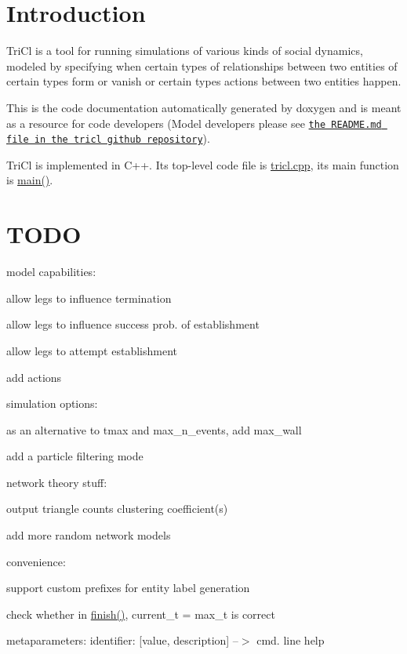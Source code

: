 \section*{Introduction }

Tri\+Cl is a tool for running simulations of various kinds of social dynamics, modeled by specifying when certain types of relationships between two entities of certain types form or vanish or certain types actions between two entities happen.

This is the code documentation automatically generated by doxygen and is meant as a resource for code developers (Model developers please see \href{https://github.com/mensch72/tricl}{\tt the R\+E\+A\+D\+M\+E.\+md file in the tricl github repository}).

Tri\+Cl is implemented in C++. Its top-\/level code file is \hyperlink{tricl_8cpp}{tricl.\+cpp}, its main function is \hyperlink{tricl_8cpp_a0ddf1224851353fc92bfbff6f499fa97}{main()}.

\section*{T\+O\+DO }

model capabilities\+:
\begin{DoxyItemize}
\item allow legs to influence termination
\item allow legs to influence success prob. of establishment
\item allow legs to attempt establishment
\item add actions
\end{DoxyItemize}

simulation options\+:
\begin{DoxyItemize}
\item as an alternative to tmax and max\+\_\+n\+\_\+events, add max\+\_\+wall
\item add a particle filtering mode
\end{DoxyItemize}

network theory stuff\+:
\begin{DoxyItemize}
\item output triangle counts clustering coefficient(s)
\item add more random network models
\end{DoxyItemize}

convenience\+:
\begin{DoxyItemize}
\item support custom prefixes for entity label generation
\item check whether in \hyperlink{finish_8cpp_a6dfe1abe0d1eb3ddc1ca081de98b5342}{finish()}, current\+\_\+t = max\+\_\+t is correct
\item metaparameters\+: identifier\+: \mbox{[}value, description\mbox{]} --$>$ cmd. line help
\end{DoxyItemize}

